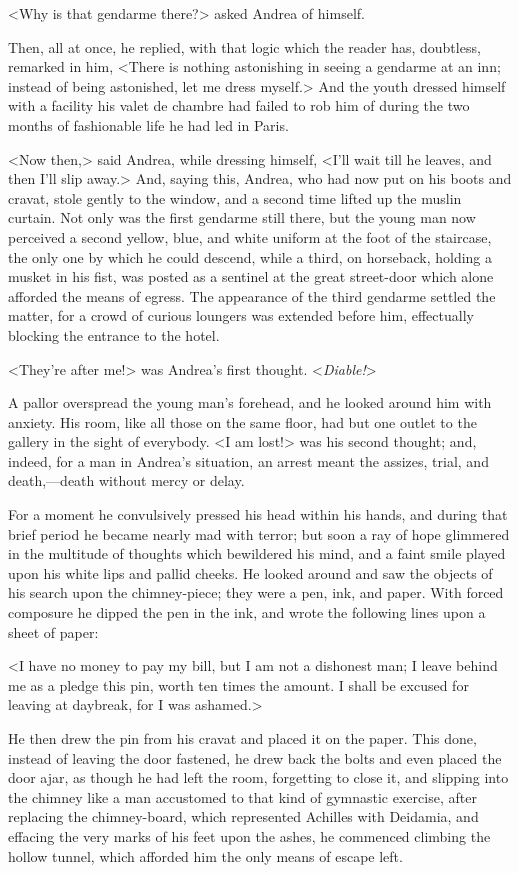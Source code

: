  <Why is that gendarme there?> asked Andrea of himself. 

 Then, all at once, he replied, with that logic which the reader has, doubtless, remarked in him, <There is nothing astonishing in seeing a gendarme at an inn; instead of being astonished, let me dress myself.> And the youth dressed himself with a facility his valet de chambre had failed to rob him of during the two months of fashionable life he had led in Paris. 

 <Now then,> said Andrea, while dressing himself, <I'll wait till he leaves, and then I'll slip away.>  And, saying this, Andrea, who had now put on his boots and cravat, stole gently to the window, and a second time lifted up the muslin curtain. Not only was the first gendarme still there, but the young man now perceived a second yellow, blue, and white uniform at the foot of the staircase, the only one by which he could descend, while a third, on horseback, holding a musket in his fist, was posted as a sentinel at the great street-door which alone afforded the means of egress. The appearance of the third gendarme settled the matter, for a crowd of curious loungers was extended before him, effectually blocking the entrance to the hotel. 

 <They're after me!> was Andrea's first thought. <\textit{Diable!}> 

 A pallor overspread the young man's forehead, and he looked around him with anxiety. His room, like all those on the same floor, had but one outlet to the gallery in the sight of everybody. <I am lost!> was his second thought; and, indeed, for a man in Andrea's situation, an arrest meant the assizes, trial, and death,—death without mercy or delay. 

 For a moment he convulsively pressed his head within his hands, and during that brief period he became nearly mad with terror; but soon a ray of hope glimmered in the multitude of thoughts which bewildered his mind, and a faint smile played upon his white lips and pallid cheeks. He looked around and saw the objects of his search upon the chimney-piece; they were a pen, ink, and paper. With forced composure he dipped the pen in the ink, and wrote the following lines upon a sheet of paper: 

 <I have no money to pay my bill, but I am not a dishonest man; I leave behind me as a pledge this pin, worth ten times the amount. I shall be excused for leaving at daybreak, for I was ashamed.> 

 He then drew the pin from his cravat and placed it on the paper. This done, instead of leaving the door fastened, he drew back the bolts and even placed the door ajar, as though he had left the room, forgetting to close it, and slipping into the chimney like a man accustomed to that kind of gymnastic exercise, after replacing the chimney-board, which represented Achilles with Deidamia, and effacing the very marks of his feet upon the ashes, he commenced climbing the hollow tunnel, which afforded him the only means of escape left. 

